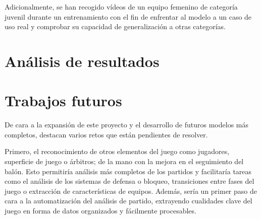 \documentclass[12pt]{report} %
\begin{document}
    Adicionalmente, se han recogido vídeos de un equipo femenino de categoría
    juvenil durante un entrenamiento con el fin de enfrentar al modelo a un
    caso de uso real y comprobar su capacidad de generalización a otras categorías.
%
%
%
%
%
%

    \chapter{Análisis de resultados}
    \label{chap:resultados}

    \chapter{Trabajos futuros}
    \label{chap:future}

    De cara a la expansión de este proyecto y el desarrollo de futuros modelos
    más completos, destacan varios retos que están pendientes de resolver.

    Primero, el reconocimiento de otros elementos del juego como jugadores,
    superficie de juego o árbitros; de la mano con la mejora en el seguimiento
    del balón. Esto permitiría análisis más completos de los partidos y
    facilitaría tareas como el análisis de los sistemas de defensa o bloqueo,
    transiciones entre fases del juego o extracción de características de
    equipos. Además, sería un primer paso de cara a la automatización del
    análisis de partido, extrayendo cualidades clave del juego en forma de
    datos organizados y fácilmente procesables.
\end{document}
